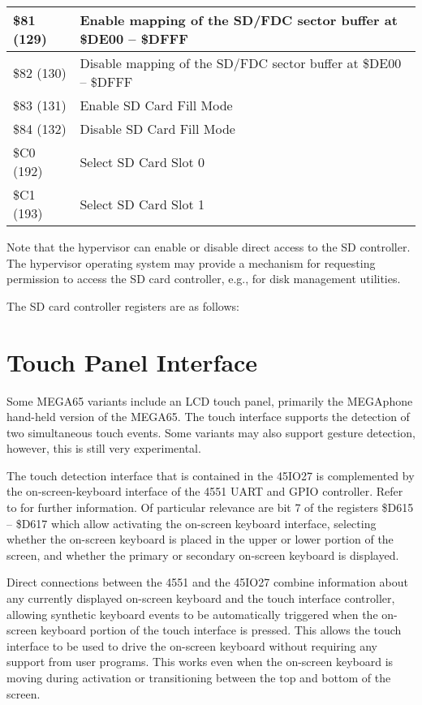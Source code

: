 \begin{longtable}{|L{2.4cm}|L{8cm}|}
 \hline
\small \$81 (129) & Enable mapping of the SD/FDC sector buffer at
\$DE00 -- \$DFFF \\
 \hline
\small \$82 (130) & Disable mapping of the SD/FDC sector buffer at
\$DE00 -- \$DFFF \\
 \hline
\small \$83 (131) & Enable SD Card Fill Mode \\
 \hline
\small \$84 (132) & Disable SD Card Fill Mode \\
 \hline
\small \$C0 (192) & Select SD Card Slot 0 \\
 \hline
\small \$C1 (193) & Select SD Card Slot 1 \\
 \hline
   \end{longtable}


Note that the hypervisor can enable or disable direct access to the SD
controller. The hypervisor operating system may provide a mechanism
for requesting permission to access the SD card controller, e.g., for
disk management utilities.

The SD card controller registers are as follows:



\section{Touch Panel Interface}

Some MEGA65 variants include an LCD touch panel, primarily the
MEGAphone hand-held version of the MEGA65.  The touch interface
supports the detection of two simultaneous touch events.  Some
variants may also support gesture detection, however, this is still
very experimental.

The touch detection interface that is contained in the 45IO27 is
complemented by the on-screen-keyboard interface of the 4551 UART and
GPIO controller.  Refer to  for further
information.  Of particular relevance are bit 7 of the registers \$D615 --
\$D617 which allow activating the on-screen keyboard interface,
selecting whether the on-screen keyboard is placed in the upper or
lower portion of the screen, and whether the primary or secondary
on-screen keyboard is displayed.

Direct connections between the 4551 and the 45IO27 combine information
about any currently displayed on-screen keyboard and the touch
interface controller, allowing synthetic keyboard events to be
automatically triggered when the on-screen keyboard portion of the
touch interface is pressed.  This allows the touch interface to be
used to drive the on-screen keyboard without requiring any support
from user programs. This works even when the on-screen keyboard is
moving during activation or transitioning between the top and bottom
of the screen.

